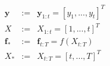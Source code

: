 \documentclass[10pt]{article}
\begin{document}
\begin{eqnarray*}
\mathbf{y} &:=& \mathbf{y}_{1:t} = [y_1, ..., y_t]^T \\
X &:=& X_{1:t} = [1, ..., t]^T \\
\mathbf{f}_* &:=& \mathbf{f}_{t:T} = f(X_{t:T}) \\
X_* &:=& X_{t:T} = [t, ..., T]^T 
\end{eqnarray*}
\end{document}
